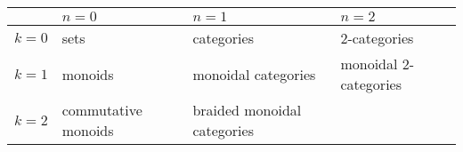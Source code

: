 \documentclass{article}
\begin{document}
\begin{longtable}[]{@{}llll@{}}
\toprule
\begin{minipage}[b]{0.26\columnwidth}\raggedright
\strut
\end{minipage} & \begin{minipage}[b]{0.21\columnwidth}\raggedright
\(n=0\)\strut
\end{minipage} & \begin{minipage}[b]{0.21\columnwidth}\raggedright
\(n=1\)\strut
\end{minipage} & \begin{minipage}[b]{0.21\columnwidth}\raggedright
\(n=2\)\strut
\end{minipage}\tabularnewline
\midrule
\endhead
\begin{minipage}[t]{0.26\columnwidth}\raggedright
\(k=0\)\strut
\end{minipage} & \begin{minipage}[t]{0.21\columnwidth}\raggedright
sets\strut
\end{minipage} & \begin{minipage}[t]{0.21\columnwidth}\raggedright
categories\strut
\end{minipage} & \begin{minipage}[t]{0.21\columnwidth}\raggedright
2-categories\strut
\end{minipage}\tabularnewline
\begin{minipage}[t]{0.26\columnwidth}\raggedright
\(k=1\)\strut
\end{minipage} & \begin{minipage}[t]{0.21\columnwidth}\raggedright
monoids\strut
\end{minipage} & \begin{minipage}[t]{0.21\columnwidth}\raggedright
monoidal categories\strut
\end{minipage} & \begin{minipage}[t]{0.21\columnwidth}\raggedright
monoidal 2-categories\strut
\end{minipage}\tabularnewline
\begin{minipage}[t]{0.26\columnwidth}\raggedright
\(k=2\)\strut
\end{minipage} & \begin{minipage}[t]{0.21\columnwidth}\raggedright
commutative monoids\strut
\end{minipage} & \begin{minipage}[t]{0.21\columnwidth}\raggedright
braided monoidal categories\strut
\end{minipage} & \begin{minipage}[t]{0.21\columnwidth}\raggedright

\end{minipage}
\end{longtable}
\end{document}
